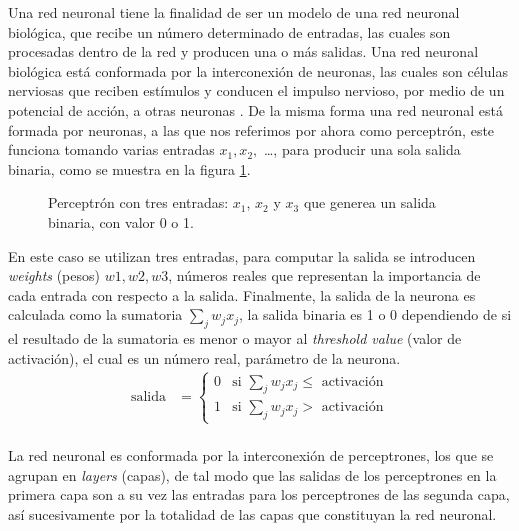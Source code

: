 \documentclass{iccmemoria}
\begin{document}
Una red neuronal tiene la finalidad de ser un modelo de una red neuronal biológica, que recibe un número determinado de entradas, las cuales son procesadas dentro de la red y producen una o más salidas. Una red neuronal biológica está conformada por la interconexión de neuronas, las cuales son células nerviosas que reciben estímulos y conducen el impulso nervioso, por medio de un potencial de acción, a otras neuronas \cite{cayre2002common}. De la misma forma una red neuronal está formada por neuronas, a las que nos referimos por ahora como perceptrón, este funciona tomando varias entradas $ x_{1}, x_{2}, $ \dots, para producir una sola salida binaria, como se muestra en la figura \ref{fig:perceptron}.\\

\begin{figure}[H]
  \centering
  \begin{Large}
  
  \end{Large}
  \caption{Perceptrón con tres entradas: $x_{1}$, $x_{2}$ y $x_{3}$ que generea un salida binaria, con valor 0 o 1.}
  \label{fig:perceptron}
\end{figure}

En este caso se utilizan tres entradas, para computar la salida se introducen \emph{weights} (pesos) $w1, w2, w3$, números reales que representan la importancia de cada entrada con respecto a la salida. Finalmente, la salida de la neurona es calculada como la sumatoria $ \sum_{j}{} w_{j} x_{j}$, la salida binaria es 1 o 0 dependiendo de si el resultado de la sumatoria es menor o mayor al \emph{threshold value} (valor de activación), el cual es un número real, parámetro de la neurona.\\

\begin{equation}
	\begin{split}
	\mbox{salida} & = \begin{cases}
		0 & \mbox{si } \sum_j w_j x_j \leq  \mbox{ activación}\\
		1 & \mbox{si } \sum_j w_j x_j >  \mbox{ activación}
		\end{cases}
	\end{split}
\end{equation}\\

La red neuronal es conformada por la interconexión de perceptrones, los que se agrupan en \emph{layers} (capas), de tal modo que las salidas de los perceptrones en la primera capa son a su vez las entradas para los perceptrones de las segunda capa, así sucesivamente por la totalidad de las capas que constituyan la red neuronal.\\
\end{document}
